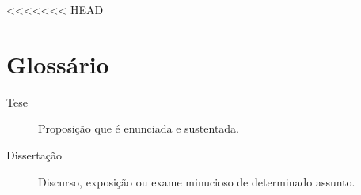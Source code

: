 <<<<<<< HEAD
\chapter*{Glossário}

\begin{description}
  \item[Tese] Proposição que é enunciada e sustentada.
  \item[Dissertação] Discurso, exposição ou exame minucioso de
    determinado assunto.
\end{description}

